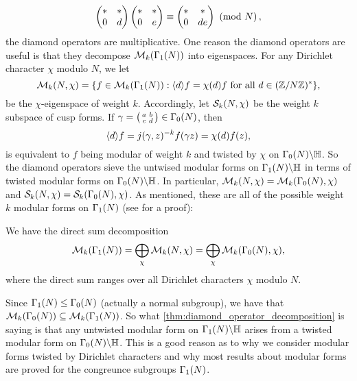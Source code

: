       \[
        \begin{pmatrix} \ast & \ast \\ 0 & d \end{pmatrix}\begin{pmatrix} \ast & \ast \\ 0 & e \end{pmatrix} \equiv \begin{pmatrix} \ast & \ast \\ 0 & de \end{pmatrix} \ \left(\text{mod }N\right),
      \]
      the diamond operators are multiplicative. One reason the diamond operators are useful is that they decompose $\mathcal{M}_{k}(\Gamma_{1}(N))$ into eigenspaces. For any Dirichlet character $\chi$ modulo $N$, we let
      \[
        \mathcal{M}_{k}(N,\chi) = \{f \in \mathcal{M}_{k}(\Gamma_{1}(N)):\langle d\rangle f = \chi(d)f \text{ for all } d \in (\mathbb{Z}/N\mathbb{Z})^{\ast}\},
      \]
      be the $\chi$-eigenspace of weight $k$. Accordingly, let $\mathcal{S}_{k}(N,\chi)$ be the weight $k$ subspace of cusp forms. If $\gamma = \begin{psmallmatrix} a & b \\ c & d \end{psmallmatrix} \in \Gamma_{0}(N)$, then
      \[
        \langle d\rangle f = j(\gamma,z)^{-k}f(\gamma z) = \chi(d)f(z),
      \]
      is equivalent to $f$ being modular of weight $k$ and twisted by $\chi$ on $\Gamma_{0}(N)\backslash\mathbb{H}$. So the diamond operators sieve the untwised modular forms on $\Gamma_{1}(N)\backslash\mathbb{H}$ in terms of twisted modular forms on $\Gamma_{0}(N)\backslash\mathbb{H}$. In particular, $\mathcal{M}_{k}(N,\chi) = \mathcal{M}_{k}(\Gamma_{0}(N),\chi)$ and $\mathcal{S}_{k}(N,\chi) = \mathcal{S}_{k}(\Gamma_{0}(N),\chi)$. As mentioned, these are all of the possible weight $k$ modular forms on $\Gamma_{1}(N)$ (see \cite{diamond2005first} for a proof):

      \begin{proposition}\label{thm:diamond_operator_decomposition}
        We have the direct sum decomposition
        \[
          \mathcal{M}_{k}(\Gamma_{1}(N)) = \bigoplus_{\chi}\mathcal{M}_{k}(N,\chi) = \bigoplus_{\chi}\mathcal{M}_{k}(\Gamma_{0}(N),\chi),
        \]
          where the direct sum ranges over all Dirichlet characters $\chi$ modulo $N$.
      \end{proposition}

      Since $\Gamma_{1}(N) \le \Gamma_{0}(N)$ (actually a normal subgroup), we have that $\mathcal{M}_{k}(\Gamma_{0}(N)) \subseteq \mathcal{M}_{k}(\Gamma_{1}(N))$. So what \cref{thm:diamond_operator_decomposition} is saying is that any untwisted modular form on $\Gamma_{1}(N)\backslash\mathbb{H}$ arises from a twisted modular form on $\Gamma_{0}(N)\backslash\mathbb{H}$. This is a good reason as to why we consider modular forms twisted by Dirichlet characters and why most results about modular forms are proved for the congreunce subgroups $\Gamma_{1}(N)$.
